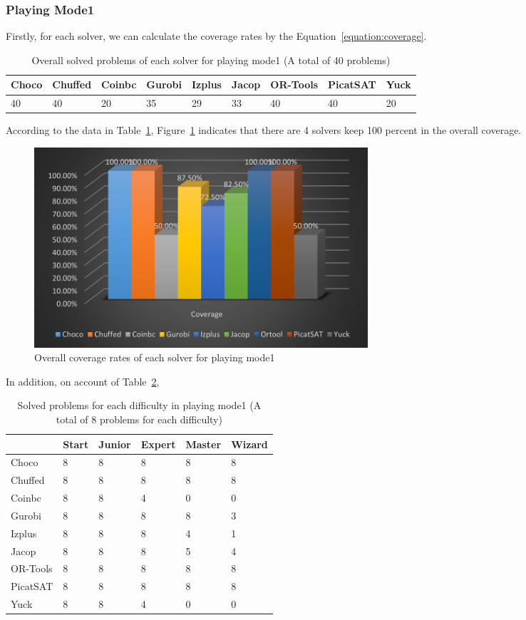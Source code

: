 \subsubsection{Playing Mode1}
Firstly, for each solver, we can calculate the coverage rates by the Equation~\ref{equation:coverage}.
\begin{table}[htbp]
\centering
\caption{Overall solved problems of each solver for playing mode1 (A total of 40 problems)}
\label{tab:solvedproblem1}
\begin{tabular}{|l|l|l|l|l|l|l|l|l|}
\hline
Choco & Chuffed & Coinbc& Gurobi & Izplus&Jacop& OR-Tools& PicatSAT&Yuck \\
\hline
40   &40      & 20    & 35    &29     &33   &40    &40      &20\\
\hline
\end{tabular}
\end{table}
According to the data in Table~\ref{tab:solvedproblem1}, Figure~\ref{fig:mode1eva2} indicates that there are 4 solvers keep 100 percent in the overall coverage.
\begin{figure}[H]
     \centering
    \includegraphics[width=0.6\textwidth]{figs/mode1coverage.png}
    \caption{Overall coverage rates of each solver for playing mode1}
    \label{fig:mode1eva2}
\end{figure}
In addition, on account of Table~\ref{tab:solvedproblemforeach difficulty1}, 
\begin{table}[H]
\centering
\caption{Solved problems for each difficulty in playing mode1 (A total of 8 problems for each difficulty)}
\label{tab:solvedproblemforeach difficulty1}
\begin{tabular}{|l|l|l|l|l|l|}
\hline
	    &Start	&Junior	&Expert	&Master	&Wizard\\
\hline
Choco	&8	&8	&8	&8	&8\\
\hline
Chuffed	&8	&8	&8	&8	&8\\
\hline
Coinbc	&8	&8	&4	&0	&0\\
\hline
Gurobi	&8	&8	&8	&8	&3\\
\hline
Izplus	&8	&8	&8	&4	&1\\
\hline
Jacop	&8	&8	&8	&5	&4\\
\hline
OR-Tools	&8	&8	&8	&8	&8\\
\hline
PicatSAT	&8	&8	&8	&8	&8\\
\hline
Yuck	&8	&8	&4	&0	&0\\
\hline
\end{tabular}
\end{table}
